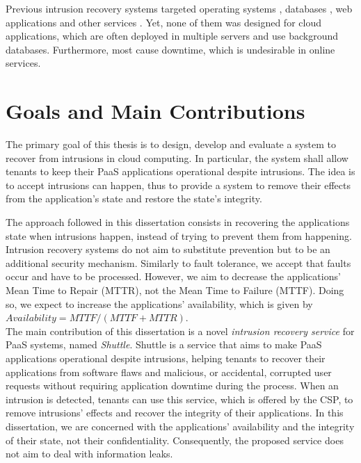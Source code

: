 Previous intrusion recovery systems targeted operating systems \cite{taser,retro}, databases \cite{itdb,phoenix}, web applications \cite{goel,warp,aire} and other services \cite{undoForOperators}. Yet, none of them was designed for cloud applications, which are often deployed in multiple servers and use background databases. Furthermore, most cause downtime, which is undesirable in online services.
 
\section{Goals and Main Contributions}\label{sec:introduction:goals}
The primary goal of this thesis is to design, develop and evaluate a system to recover from intrusions in cloud computing. In particular, the system shall allow tenants to keep their \ac{PaaS} applications operational despite intrusions. The idea is to accept intrusions can happen, thus to provide a system to remove their effects from the application's state and restore the state's integrity. 

The approach followed in this dissertation consists in recovering the applications state when intrusions happen, instead of trying to prevent them from happening. Intrusion recovery systems do not aim to substitute prevention but to be an additional security mechanism. Similarly to fault tolerance, we accept that faults occur and have to be processed. However, we aim to decrease the applications' Mean Time to Repair (MTTR), not the Mean Time to Failure (MTTF). Doing so, we expect to increase the applications' availability, which is given by $Availability=MTTF/(MTTF+MTTR)$. \\

The main contribution of this dissertation is a novel \emph{intrusion recovery service} for \ac{PaaS} systems, named \emph{Shuttle}. Shuttle is a service that aims to make \ac{PaaS} applications operational despite intrusions, helping tenants to recover their applications from software flaws and malicious, or accidental, corrupted user requests without requiring application downtime during the process. When an intrusion is detected, tenants can use this service, which is offered by the \ac{CSP}, to remove intrusions' effects and recover the integrity of their applications. In this dissertation, we are concerned with the applications' availability and the integrity of their state, not their confidentiality. Consequently, the proposed service does not aim to deal with information leaks.



